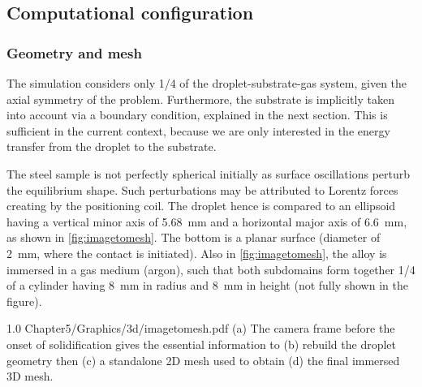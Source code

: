 \subsection{Computational configuration}

\subsubsection{Geometry and mesh}

The simulation considers only 1/4 of the droplet-substrate-gas system, given the axial symmetry of the problem.
Furthermore, the substrate is implicitly taken into account via a boundary condition, explained in the next section. 
This is sufficient in the current context, because we are only interested in the energy transfer from the droplet to the substrate. 

The steel sample is not perfectly spherical initially as surface oscillations perturb the equilibrium shape. 
Such perturbations may be attributed to Lorentz forces creating by the positioning coil. 
The droplet hence is compared to an ellipsoid having
a vertical minor axis of \SI{5.68}{\milli \metre} and a horizontal major axis of \SI{6.6}{\milli \metre}, as shown in \cref{fig:imagetomesh}.
The bottom is a planar surface (diameter of \SI{2}{\milli \metre}, where the contact is initiated). 
Also in \cref{fig:imagetomesh}, the alloy is immersed in a gas medium (argon), such that both subdomains form together 1/4 of a 
cylinder having \SI{8}{\milli \metre} in radius and  \SI{8}{\milli \metre} in height (not fully shown in the figure).

\begin{figureth}
{1.0}
{Chapter5/Graphics/3d/imagetomesh.pdf}
{(a) The camera frame before the onset of solidification gives the essential information to (b) 
rebuild the droplet geometry then (c) a standalone 2D mesh used to obtain (d) the final immersed 3D mesh.}
\label{fig:imagetomesh}
\end{figureth}

